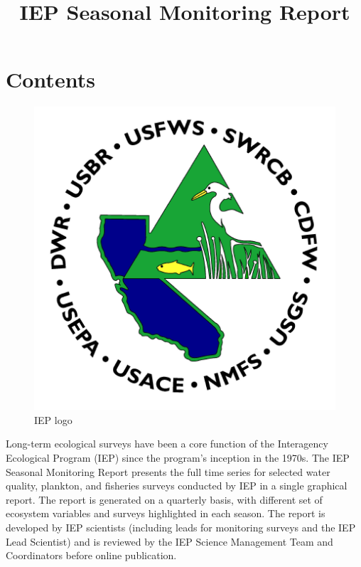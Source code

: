 \documentclass[
]{book}
\title{IEP Seasonal Monitoring Report}
\author{}
\date{\vspace{-2.5em}}
\begin{document}
\maketitle

{
\setcounter{tocdepth}{1}
\tableofcontents
}
\hypertarget{contents}{%
\chapter{Contents}\label{contents}}

\begin{figure}
\includegraphics[width=5.99in]{figures/IEP_logo_updated} \caption{IEP logo}\label{fig:unnamed-chunk-1}
\end{figure}

Long-term ecological surveys have been a core function of the Interagency Ecological Program (IEP) since the program's inception in the 1970s. The IEP Seasonal Monitoring Report presents the full time series for selected water quality, plankton, and fisheries surveys conducted by IEP in a single graphical report. The report is generated on a quarterly basis, with different set of ecosystem variables and surveys highlighted in each season. The report is developed by IEP scientists (including leads for monitoring surveys and the IEP Lead Scientist) and is reviewed by the IEP Science Management Team and Coordinators before online publication.
\end{document}
